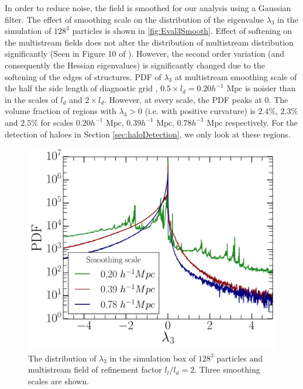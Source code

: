{In order to reduce noise, the field is smoothed for our analysis using a Gaussian filter. The effect of smoothing scale on the distribution of the eigenvalue $\lambda_3$ in the simulation of $128^3$ particles is shown in \autoref{fig:Eval3Smooth}. Effect of softening on the multistream fields does not alter the distribution of multistream distribution significantly (Seen in Figure 10 of \citealt{Ramachandra2017}).
However, the second order variation (and consequently the Hessian eigenvalues) is significantly changed due to the softening of the edges of structures. PDF of $\lambda_3$ at multistream smoothing scale of the half the side length of diagnostic grid , $0.5 \times l_d = 0.20 h^{-1} \text{ Mpc}$ is noisier than in the scales of $l_d$ and $2 \times l_d$. However, at every scale, the PDF peaks at $0$. The volume fraction of regions with $\lambda_3 > 0$ (i.e. with positive curvature) is $2.4\%$, $2.3\%$ and $2.5\%$ for scales $0.20 h^{-1} \text{ Mpc}$, $0.39 h^{-1} \text{ Mpc}$, $0.78 h^{-1} \text{ Mpc}$ respectively. For the detection of haloes in Section \ref{sec:haloDetection}, we only look at these regions.

 


\begin{figure}
\begin{minipage}[t]{.99\linewidth}
 \centering\includegraphics[width=10.cm]{Chapter5/Source_v2/fig5.pdf} 
\end{minipage}\hfill
\caption{The distribution of $\lambda_3$ in the simulation box of $128^3$ particles and multistream field of refinement factor $l_l/l_d = 2$. Three smoothing scales are shown. }
\label{fig:Eval3Smooth}
\end{figure}

}
